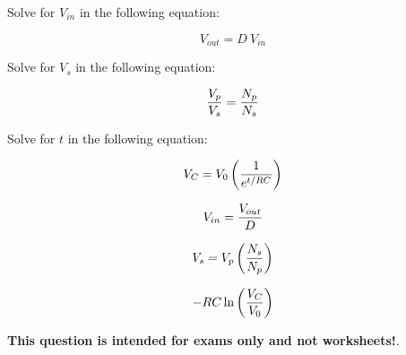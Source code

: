 

Solve for $V_{in}$ in the following equation:

$$V_{out} = D \> V_{in}$$

\vskip 20pt

Solve for $V_s$ in the following equation:

$${V_p \over V_s} = {N_p \over N_s}$$

\vskip 20pt

Solve for $t$ in the following equation:

$$V_C = V_0 \left( 1 \over e^{t/RC}\right)$$








$$V_{in} = {V_{out} \over D}$$

$$V_s = V_p \left({N_s \over N_p}\right)$$

$$-RC \ln \left({V_C \over V_0}\right)$$







{\bf This question is intended for exams only and not worksheets!}.




